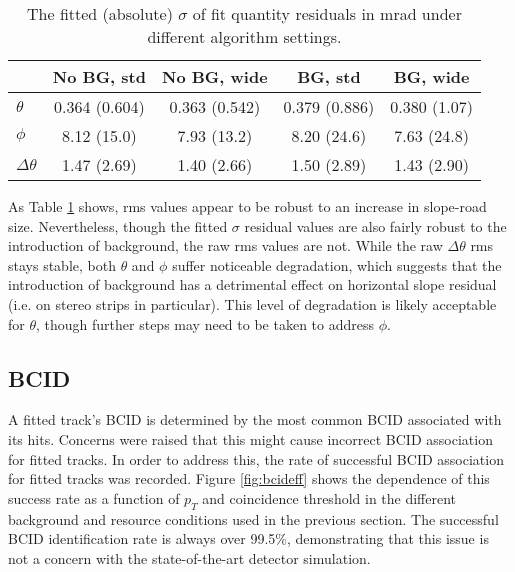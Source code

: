 \begin{table}[htbp]
\begin{center}
\begin{tabular}{|l|c|c|c|c|}
\hline
               & No BG, std    & No BG, wide   & BG, std       & BG, wide\\
\hline
$\theta$       & 0.364 (0.604) & 0.363 (0.542) & 0.379 (0.886) & 0.380 (1.07)  \\
$\phi$         & 8.12 (15.0)   & 7.93 (13.2)   & 8.20 (24.6)   & 7.63 (24.8)\\
$\Delta\theta$ & 1.47 (2.69)   & 1.40 (2.66)   & 1.50 (2.89)   & 1.43 (2.90)\\
\hline
\end{tabular}
\caption{\label{tab:resbgfat} The fitted (absolute) $\sigma$ of fit quantity residuals in mrad under different algorithm settings.}
\end{center}
\end{table}

As Table \ref{tab:resbgfat} shows, rms values appear to be robust to an increase in slope-road size.  Nevertheless, though the fitted $\sigma$ residual values are also fairly robust to the introduction of background, the raw rms values are not.  While the raw $\Delta\theta$ rms stays stable, both $\theta$ and $\phi$ suffer noticeable degradation, which suggests that the introduction of background has a detrimental effect on horizontal slope residual (i.e. on stereo strips in particular).  This level of degradation is likely acceptable for $\theta$, though further steps may need to be taken to address $\phi$.  %

\subsection{BCID}
A fitted track's BCID is determined by the most common BCID associated with its hits.  Concerns were raised that this might cause incorrect BCID association for fitted tracks.  In order to address this, the rate of successful BCID association for fitted tracks was recorded.  Figure \ref{fig:bcideff} shows the dependence of this success rate as a function of $p_T$ and coincidence threshold in the different background and resource conditions used in the previous section.  The successful BCID identification rate is always over 99.5\%, demonstrating that this issue is not a concern with the state-of-the-art detector simulation.

